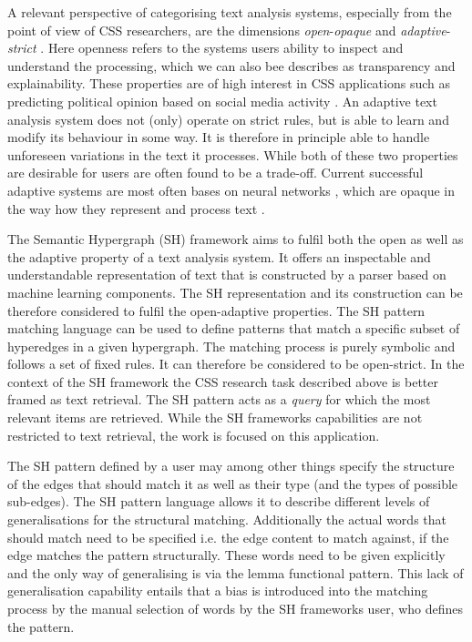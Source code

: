 \documentclass[11pt]{scrreprt}
\let\cite\parencite  %
\begin{document}
A relevant perspective of categorising text analysis systems, especially from the point of view of CSS researchers, are the dimensions \textit{open}-\textit{opaque} and \textit{adaptive}-\textit{strict} \cite{menezesSemanticHypergraphs2021}. Here openness refers to the systems users ability to inspect and understand the processing, which we can also bee describes as transparency and explainability. These properties are of high interest in CSS applications such as predicting political opinion based on social media activity \cite{wilkersonLargeScaleComputerizedText2017}. An adaptive text analysis system does not (only) operate on strict rules, but is able to learn and modify its behaviour in some way. It is therefore in principle able to handle unforeseen variations in the text it processes. While both of these two properties are desirable for users are often found to be a trade-off. Current successful adaptive systems are most often bases on neural networks \cite{hirschbergAdvancesNaturalLanguage2015}, which are opaque in the way how they represent and process text \cite{rudinStopExplainingBlack2019}. 

The Semantic Hypergraph (SH) framework aims to fulfil both the open as well as the adaptive property of a text analysis system. It offers an inspectable and understandable representation of text that is constructed by a parser based on machine learning components. The SH representation and its construction can be therefore considered to fulfil the open-adaptive properties. The SH pattern matching language can be used to define patterns that match a specific subset of hyperedges in a given hypergraph. The matching process is purely symbolic and follows a set of fixed rules. It can therefore be considered to be open-strict. In the context of the SH framework the CSS research task described above is better framed as text retrieval. The SH pattern acts  as a \textit{query} for which the most relevant items are retrieved. While the SH frameworks capabilities are not restricted to text retrieval, the work is focused on this application.

The SH pattern defined by a user may among other things specify the structure of the edges that should match it as well as their type (and the types of possible sub-edges). The SH pattern language allows it to describe different levels of generalisations for the structural matching. Additionally the actual words that should match need to be specified i.e. the edge content to match against, if the edge matches the pattern structurally. These words need to be given explicitly and the only way of generalising is via the lemma functional pattern. This lack of generalisation capability entails that a bias is introduced into the matching process by the manual selection of words by the SH frameworks user, who defines the pattern.
\end{document}
